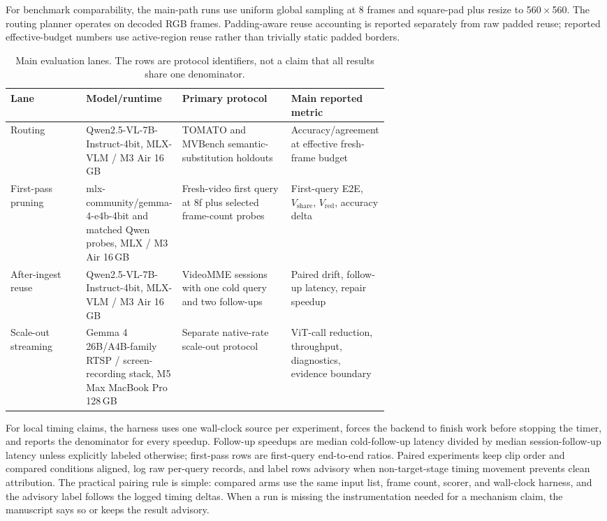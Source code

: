 For benchmark comparability, the main-path runs use uniform global sampling at
8 frames and square-pad plus resize to 560\,$\times$\,560. The routing planner
operates on decoded RGB frames. Padding-aware reuse accounting is reported
separately from raw padded reuse; reported effective-budget numbers use
active-region reuse rather than trivially static padded borders.

\begin{table}[H]
\centering
\caption{Main evaluation lanes. The rows are protocol identifiers, not a
claim that all results share one denominator.}
\label{tab:setup-lanes}
\small
\renewcommand{\arraystretch}{\PaperTableStretch}
\begin{tabularx}{\linewidth}{@{}>{\raggedright\arraybackslash}p{0.20\linewidth} >{\raggedright\arraybackslash}p{0.23\linewidth} Y >{\raggedright\arraybackslash}p{0.20\linewidth}@{}}
\toprule
Lane & Model/runtime & Primary protocol & Main reported metric \\
\midrule
Routing & Qwen2.5-VL-7B-Instruct-4bit, MLX-VLM / M3 Air 16\,GB & TOMATO and MVBench
semantic-substitution holdouts & Accuracy/agreement at effective fresh-frame
budget \\
First-pass pruning & mlx-community/gemma-4-e4b-4bit and matched Qwen probes, MLX / M3 Air 16\,GB & Fresh-video
first query at 8f plus selected frame-count probes & First-query E2E, \(V_{\mathrm{share}}\),
\(V_{\mathrm{red}}\), accuracy delta \\
After-ingest reuse & Qwen2.5-VL-7B-Instruct-4bit, MLX-VLM / M3 Air 16\,GB & VideoMME sessions
with one cold query and two follow-ups & Paired drift, follow-up latency,
repair speedup \\
Scale-out streaming & Gemma 4 26B/A4B-family RTSP / screen-recording stack,
M5 Max MacBook Pro 128\,GB &
Separate native-rate scale-out protocol & ViT-call reduction, throughput, diagnostics,
evidence boundary \\
\bottomrule
\end{tabularx}
\end{table}

For local timing claims, the harness uses one wall-clock source per experiment,
forces the backend to finish work before stopping the timer, and reports the
denominator for every speedup. Follow-up speedups are median cold-follow-up
latency divided by median session-follow-up latency unless explicitly labeled
otherwise; first-pass rows are first-query end-to-end ratios. Paired
experiments keep clip order and compared conditions aligned, log raw per-query
records, and label rows advisory when non-target-stage timing movement prevents
clean attribution. The practical pairing rule is simple: compared arms use the
same input list, frame count, scorer, and wall-clock harness, and the advisory
label follows the logged timing deltas. When a run is missing the
instrumentation needed for a mechanism claim, the manuscript says so or keeps
the result advisory.

